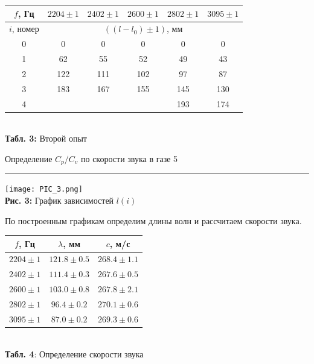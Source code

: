 \documentclass[12pt,a4paper]{scrartcl}
\begin{document}
	\begin{center}
		\begin{tabular}{|c|c|c|c|c|c|}
			\hline
			$f$, Гц & $2204 \pm 1$ &  $2402 \pm 1$ & $2600 \pm 1$ & $2802 \pm 1$ & $3095 \pm 1$
			\\\hline
			$i$, номер & \multicolumn{5}{|c|}{$((l - l_0) \pm 1)$, мм}
			\\\hline
			0 & 0 & 0 & 0 & 0 & 0
			\\\hline
			1 & 62 & 55 & 52 & 49 & 43
			\\\hline
			2 & 122 & 111 & 102 & 97 & 87
			\\\hline
			3 & 183 & 167 & 155 & 145 & 130
			\\\hline
			4 &     &     &     & 193 & 174
			\\\hline
		\end{tabular}
		\\\textbf{Табл. 3:} Второй опыт
	\end{center}

	\newpage

	
	\begin{flushleft}
		\footnotesize{Определение $C_p /C_v$ по скорости звука в газе} \hspace{\fill} \footnotesize{5}
		\\[-0.3cm]\noindent\rule{\textwidth}{0.3pt}
	\end{flushleft}

	\begin{center}
		\texttt{[image: PIC\_3.png]}
		\\\textbf{Рис. 3:} График зависимостей $l(i)$
	\end{center}
	
	По построенным графикам определим длины волн и рассчитаем скорости звука.
	
	\begin{center}
		\begin{tabular}{|c|c|c|}
			\hline
			$f$, Гц & $\lambda$, мм & $c$, м/с
			\\\hline
			$2204 \pm 1$ & $121.8 \pm 0.5$ & $268.4 \pm 1.1$
			\\\hline
			$2402 \pm 1$ & $111.4 \pm 0.3$ & $267.6 \pm 0.5$
			\\\hline
			$2600 \pm 1$ & $103.0 \pm 0.8$ & $267.8 \pm 2.1$
			\\\hline
			$2802 \pm 1$ & $96.4 \pm 0.2$ & $270.1 \pm 0.6$
			\\\hline
			$3095 \pm 1$ & $87.0 \pm 0.2$ & $269.3 \pm 0.6$
			\\\hline
		\end{tabular}
		\\\textbf{Табл. 4}: Определение скорости звука
	\end{center}
	
\end{document}
